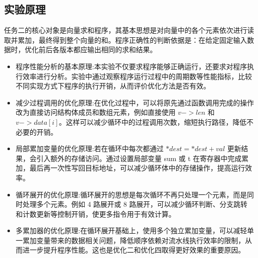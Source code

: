 \subsection{实验原理}
任务二的核心对象是向量求和程序，其基本思想是对向量中的各个元素依次进行读取并累加，最终得到整个向量的和。程序正确性的判断依据是：在给定固定输入数据时，优化前后各版本都应输出相同的求和结果。
\begin{itemize}
    \item 程序性能分析的基本原理:本实验不仅要求程序能够正确运行，还要求对程序执行效率进行分析。实验中通过观察程序运行过程中的周期数等性能指标，比较不同实现方式下程序的执行开销，从而评价优化方法是否有效。
    \item 减少过程调用的优化原理:在优化过程中，可以将原先通过函数调用完成的操作改为直接访问结构体成员和数组元素，例如直接使用 $v->len$ 和 $v->data[i]$。这样可以减少循环中的过程调用次数，缩短执行路径，降低不必要的开销。
    \item 局部累加变量的优化原理:若在循环中每次都通过 $*dest = *dest + val$ 更新结果，会引入额外的存储访问。通过设置局部变量 sum 或 t 在寄存器中完成累加，最后再一次性写回目标地址，可以减少循环体中的存储操作，提高运行效率。
    \item 循环展开的优化原理:循环展开的思想是每次循环不再只处理一个元素，而是同时处理多个元素。例如 4 路展开或 8 路展开，可以减少循环判断、分支跳转和计数更新等控制开销，使更多指令用于有效计算。
    \item 多累加器的优化原理:在循环展开基础上，使用多个独立累加变量，可以减轻单一累加变量带来的数据相关问题，降低顺序依赖对流水线执行效率的限制，从而进一步提升程序性能。这也是优化二和优化四取得更好效果的重要原因。
\end{itemize}